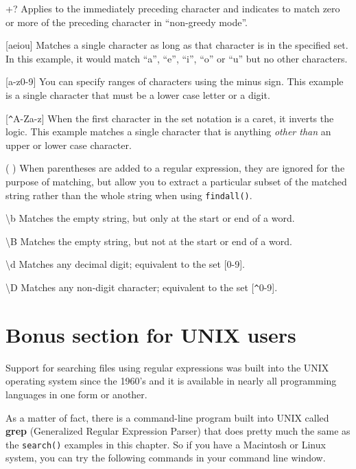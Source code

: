 \documentclass[11pt]{book}
\begin{document}
+? \newline
Applies to the immediately preceding character and indicates to match zero or more of the preceding character in ``non-greedy mode''.

[aeiou] \newline
Matches a single character as long as that character is in the specified set.  In this example, it would match ``a'', ``e'', ``i'', ``o'' or ``u'' but no other characters.

[a-z0-9] \newline
You can specify ranges of characters using the minus sign.  This example is a single character that must be a lower case letter or a digit.

[\verb"^"A-Za-z] \newline
When the first character in the set notation is a caret, it inverts the logic.  This example matches a single character that is anything {\em other than} an upper or lower case character.

( ) \newline
When parentheses are added to a regular expression, they are ignored for the purpose of matching, but allow you to extract a particular subset of the matched string rather than the whole string when using {\tt findall()}.

{\textbackslash}b \newline
Matches the empty string, but only at the start or end of a word.

{\textbackslash}B \newline
Matches the empty string, but not at the start or end of a word.

{\textbackslash}d \newline
Matches any decimal digit; equivalent to the set [0-9].

{\textbackslash}D \newline
Matches any non-digit character; equivalent to the set [\verb"^"0-9].

\section{Bonus section for UNIX users}

Support for searching files using regular expressions was built into the UNIX operating system 
since the 1960's and it is available in nearly all programming languages in one form or another.

As a matter of fact, there is a command-line program built into UNIX 
called {\bf grep} (Generalized Regular Expression Parser) that does pretty much 
the same as the {\tt search()} examples in this chapter.  So if you have a 
Macintosh or Linux system, you can try the following commands in your command line window.
\end{document}
